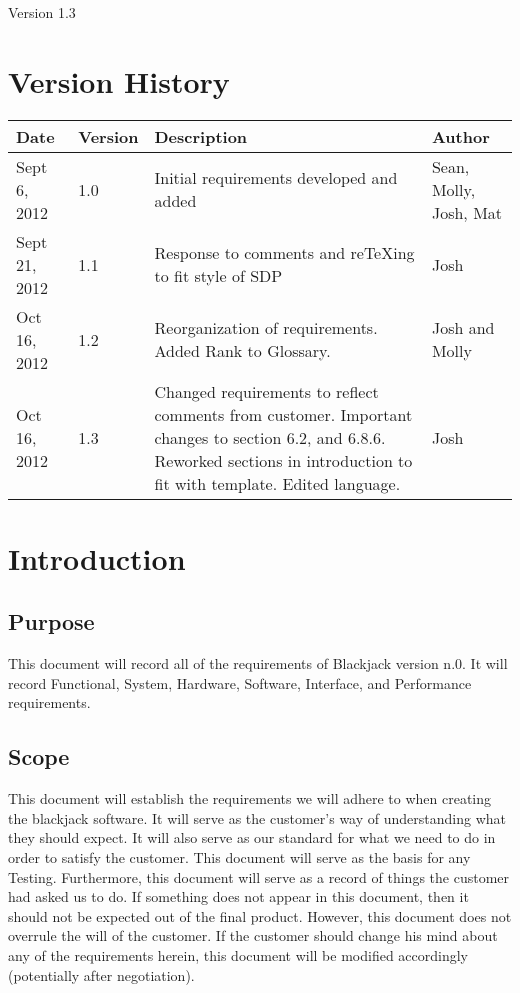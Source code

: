 \documentclass{article}
\title{\Title}
\author{\Author}
\date{\today}
\def\SRSVersion{1.3}
\def\Version{\SRSVersion}
\newcommand{\setupintro}{
\renewcommand{\thepage}{}
\maketitle
\begin{center}
\large Version \Version \normalsize
\end{center}
\newpage
\setcounter{page}{1}
\renewcommand{\thepage}{\roman{page}}
\tableofcontents 
\newpage
\setcounter{page}{1}
\renewcommand{\thepage}{\arabic{page}}
}
\begin{document}
\setupintro



\section{Version History}
\begin{tabular}{|l|l|p{3.25in}|l|}
\hline
Date & Version & Description & Author \\\hline
Sept 6, 2012 & 1.0 & Initial requirements developed and added & Sean, Molly, Josh, Mat\\\hline
Sept 21, 2012 & 1.1 & Response to comments and reTeXing to fit style of SDP & Josh\\\hline
Oct 16, 2012 & 1.2 & Reorganization of requirements. Added Rank to Glossary.& Josh and Molly\\\hline
Oct 16, 2012 & 1.3 & Changed requirements to reflect comments from customer.  Important changes to section 6.2, and 6.8.6.  Reworked sections in introduction to fit with template.  Edited language.& Josh\\\hline
\end{tabular}

\section{Introduction}

\subsection{Purpose}

This document will record all of the requirements of Blackjack version n.0.  It will record Functional, System, Hardware, Software, Interface, and Performance requirements.

\subsection{Scope}

This document will establish the requirements we will adhere to when creating the blackjack software.  It will serve as the customer's way of understanding what they should expect.  It will also serve as our standard for what we need to do in order to satisfy the customer.  This document will serve as the basis for any Testing.  Furthermore, this document will serve as a record of things the customer had asked us to do.  If something does not appear in this document, then it should not be expected out of the final product.  However, this document does not overrule the will of the customer.  If the customer should change his mind about any of the requirements herein, this document will be modified accordingly (potentially after negotiation).
\end{document}
